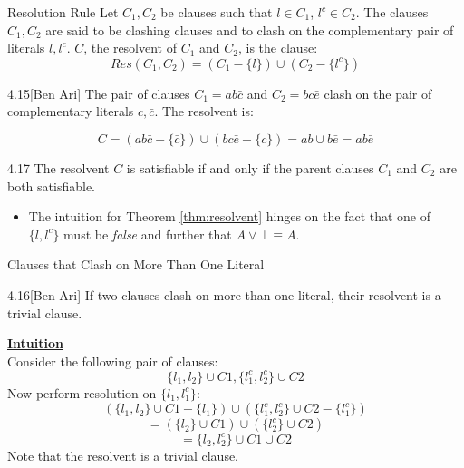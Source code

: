 \begin{wideslide}[bm=,toc=]{Resolution Rule}
Let $C_1, C_2$ be clauses such that $l \in C_1$, $l^c \in C_2$. The clauses
$C_1,C_2$ are said to be clashing clauses and to clash on the complementary
pair of literals $l,l^c$. $C$, the resolvent of $C_1$ and $C_2$, is the
clause:\\
\[ 
  Res(C_1,C_2) = (C_1 - \{l\}) \cup (C_2 - \{l^c\})
\]
\pause
\begin{ex}{4.15}[Ben Ari]
The pair of clauses $C_1 = ab\bar{c}$ and $C_2 = bc\bar{e}$ clash on the pair
of complementary literals $c, \bar{c}$. The resolvent is:

\[ 
  C = (ab\bar{c} - \{\bar{c}\}) \cup (bc\bar{e} - \{c\}) = ab\cup b\bar{e} = ab\bar{e}
  \]

\end{ex}
\pause
\begin{thm}{4.17}\label{thm:resolvent}
The resolvent $C$ is satisfiable if and only if the parent clauses $C_1$ and
$C_2$ are both satisfiable.
\end{thm}
\pause
\begin{itemize}
\item The intuition for Theorem \ref{thm:resolvent} hinges on the fact that one of 
$\{l,l^c\}$ must be \emph{false} and further that $A \lor \bot \equiv A$.
\end{itemize}
\end{wideslide}

\begin{wideslide}[bm=,toc=]{Clauses that Clash on More Than One Literal}
\begin{lem}{4.16}[Ben Ari]
If two clauses clash on more than one literal, their resolvent is a trivial
clause.
\end{lem}
\pause
{ \bf \underline{Intuition}}\\
Consider the following pair of clauses:
\[
  \{l_1, l_2\} \cup C1,  \{l_1^c, l_2^c\} \cup C2
  \]
\pause
Now perform resolution on $\{l_1, l_1^c\}$: 
\pause
\[
  (\{l_1, l_2\} \cup C1 - \{l_1\})\cup (\{l_1^c, l_2^c\} \cup C2 - \{l_1^c \})
\]
\pause
\[
  = (\{l_2\} \cup C1) \cup (\{l_2^c\} \cup C2)
\]
\pause
\[
  = \{l_2, l_2^c\} \cup C1 \cup C2
\]
\pause
Note that the resolvent is a trivial clause.
\end{wideslide}

